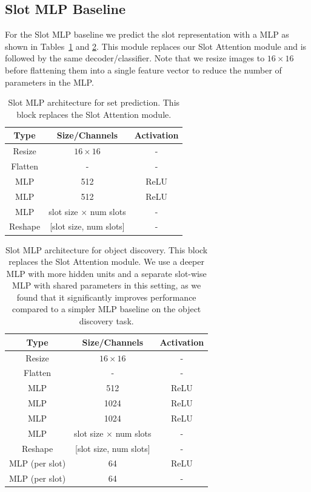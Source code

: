 \documentclass{article}
\begin{document}
\subsection{Slot MLP Baseline}
\label{sec:app_slot_mlp}
For the Slot MLP baseline we predict the slot representation with a MLP as shown in Tables~\ref{table:architecture_slot_mlp_set_pred} and \ref{table:architecture_slot_mlp_obj_discovery}. This module replaces our Slot Attention module and is followed by the same decoder/classifier. Note that we resize images to $16\times16$ before flattening them into a single feature vector to reduce the number of parameters in the MLP.

\begin{table}[htp!]
\centering
\caption{Slot MLP architecture for set prediction. This block replaces the Slot Attention module.}
\begin{tabular}{ccc}
\toprule
Type & Size/Channels & Activation  \\
\midrule
Resize & $16\times 16$ & -  \\
Flatten & - & -  \\
MLP & 512 & ReLU   \\
MLP & 512 & ReLU \\
MLP & slot size $\times$ num slots & - \\
Reshape & [slot size, num slots]   & -\\
\bottomrule
\end{tabular}
\label{table:architecture_slot_mlp_set_pred}
\end{table}


\begin{table}[htp!]
\centering
\caption{Slot MLP architecture for object discovery. This block replaces the Slot Attention module. We use a deeper MLP with more hidden units and a separate slot-wise MLP with shared parameters in this setting, as we found that it significantly improves performance compared to a simpler MLP baseline on the object discovery task.}
\begin{tabular}{ccc}
\toprule
Type & Size/Channels & Activation  \\
\midrule
Resize & $16\times 16$ & -  \\
Flatten & - & -  \\
MLP & 512 & ReLU   \\
MLP & 1024 & ReLU \\
MLP & 1024 & ReLU \\
MLP & slot size $\times$ num slots & - \\
Reshape & [slot size, num slots]   & -\\
MLP (per slot) & 64  & ReLU \\
MLP (per slot) & 64  & -\\
\bottomrule
\end{tabular}
\label{table:architecture_slot_mlp_obj_discovery}
\end{table}
\end{document}
